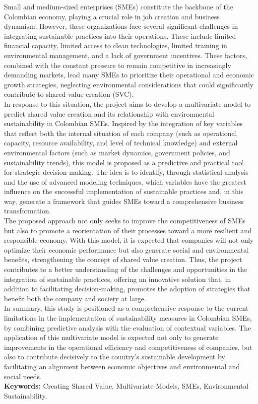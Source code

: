 Small and medium-sized enterprises (SMEs) constitute the backbone of the Colombian economy, playing a crucial role in job creation and business dynamism. However, these organizations face several significant challenges in integrating sustainable practices into their operations. These include limited financial capacity, limited access to clean technologies, limited training in environmental management, and a lack of government incentives. These factors, combined with the constant pressure to remain competitive in increasingly demanding markets, lead many SMEs to prioritize their operational and economic growth strategies, neglecting environmental considerations that could significantly contribute to shared value creation (SVC).\\

In response to this situation, the project aims to develop a multivariate model to predict shared value creation and its relationship with environmental sustainability in Colombian SMEs. Inspired by the integration of key variables that reflect both the internal situation of each company (such as operational capacity, resource availability, and level of technical knowledge) and external environmental factors (such as market dynamics, government policies, and sustainability trends), this model is proposed as a predictive and practical tool for strategic decision-making. The idea is to identify, through statistical analysis and the use of advanced modeling techniques, which variables have the greatest influence on the successful implementation of sustainable practices and, in this way, generate a framework that guides SMEs toward a comprehensive business transformation.\\

The proposed approach not only seeks to improve the competitiveness of SMEs but also to promote a reorientation of their processes toward a more resilient and responsible economy. With this model, it is expected that companies will not only optimize their economic performance but also generate social and environmental benefits, strengthening the concept of shared value creation. Thus, the project contributes to a better understanding of the challenges and opportunities in the integration of sustainable practices, offering an innovative solution that, in addition to facilitating decision-making, promotes the adoption of strategies that benefit both the company and society at large.\\

In summary, this study is positioned as a comprehensive response to the current limitations in the implementation of sustainability measures in Colombian SMEs, by combining predictive analysis with the evaluation of contextual variables. The application of this multivariate model is expected not only to generate improvements in the operational efficiency and competitiveness of companies, but also to contribute decisively to the country's sustainable development by facilitating an alignment between economic objectives and environmental and social needs.\\

\textbf{Keywords:} Creating Shared Value, Multivariate Models, SMEs, Environmental Sustainability.


